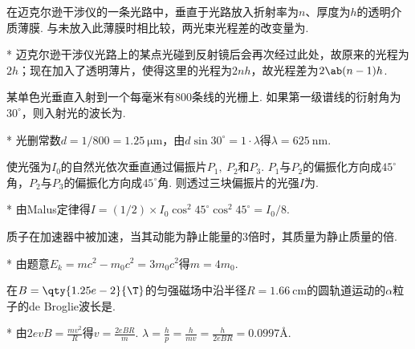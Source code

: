 \begin{problem}[迈克尔逊干涉仪][3]
    在迈克尔逊干涉仪的一条光路中，垂直于光路放入折射率为$n$、厚度为$h$的透明介质薄膜. 与未放入此薄膜时相比较，两光束光程差的改变量为.
\end{problem}
\begin{solution}*
    迈克尔逊干涉仪光路上的某点光碰到反射镜后会再次经过此处，故原来的光程为$2h$；现在加入了透明薄片，使得这里的光程为$2nh$，故光程差为$2\ab(n-1)h$.
\end{solution}

\begin{problem}[光栅][3]
    某单色光垂直入射到一个每毫米有$800$条线的光栅上. 如果第一级谱线的衍射角为$30^{\circ}$，则入射光的波长为.
\end{problem}
\begin{solution}*
    光删常数$d=1/800=\qty{1.25}{\um}$，由$d\sin{30^{\circ}}=1\cdot\lambda$得$\lambda=\qty{625}{\nm}$.
\end{solution}

\begin{problem}[光的偏振][3]
    使光强为$I_0$的自然光依次垂直通过偏振片$P_1,\ P_2$和$P_3$. $P_1$与$P_2$的偏振化方向成$45^{\circ}$角，$P_2$与$P_3$的偏振化方向成$45^{\circ}$角. 则透过三块偏振片的光强$I$为.
\end{problem}
\begin{solution}*
    由Malus定律得$I=(1/2)\times I_0\cos^2{45^{\circ}}\cos^2{45^\circ}=I_0/8$.
\end{solution}

\begin{problem}[相对论能动量关系][3]
    质子在加速器中被加速，当其动能为静止能量的$3$倍时，其质量为静止质量的倍.
\end{problem}
\begin{solution}*
    由题意$E_k=mc^2-m_0c^2=3m_0c^2$得$m=4m_0$.
\end{solution}

\begin{problem}[de Broglie波][3]
    在$B=\qty{1.25e-2}{\T}$的匀强磁场中沿半径$R=\qty{1.66}{\cm}$的圆轨道运动的$\alpha$粒子的de Broglie波长是.
\end{problem}
\begin{solution}*
    由$2evB=\frac{mv^2}{R}$得$v=\frac{2eBR}{m}$. $\lambda=\frac{h}{p}=\frac{h}{mv}=\frac{h}{2eBR}=0.0997\text{\AA}$.
\end{solution}

